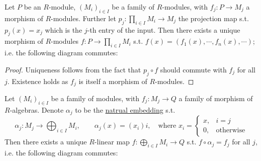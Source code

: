 \begin{theorem}\label{thm:Universal Property of Direct Product}
    Let $P$ be an $R$-module, $(M_i)_{i\in I}$ be a family of $R$-modules, with $f_j: P \to M_j$ a morphism of $R$-modules. Further let $p_j : \prod_{i\in I} M_i \to M_j$ the projection map s.t. $p_j(x) = x_j$ which is the $j$-th entry of the input. Then there exists a unique morphism of $R$-modules $f: P\to\prod_{i\in I} M_i$ s.t. $f(x) = (f_1(x), \cdots, f_n(x), \cdots)$; i.e. the following diagram commutes:
    
    \begin{minipage}{\linewidth}
        \centering
    \end{minipage}
\end{theorem}

\begin{proof}
    Uniqueness follows from the fact that $p_j\circ f$ should commute with $f_j$ for all $j$. Existence holds as $f_j$ is itself a morphism of $R$-modules.
\end{proof}

\begin{theorem}\label{thm:Universal Property of Direct Sum}
    Let $(M_i)_{i\in I}$ be a family of modules, with $f_j: M_j \to Q$ a family of morphism of $R$-algebras. Denote $\alpha_j$ to be the \underline{natrual embedding} s.t.
    \[
        \alpha_j: M_j  \to \bigoplus_{i\in I} M_i, \qquad \alpha_j(x) = (x_i)i, \quad\text{where } x_i = \begin{cases} x, & i = j \\ 0, & \text{otherwise} \end{cases}
    \]
    Then there exists a unique $R$-linear map $f: \bigoplus_{i\in I} M_i \to Q$ s.t. $f\circ \alpha_j = f_j$ for all $j$, i.e. the following diagram commutes:
    
    \begin{minipage}{\linewidth}
        \centering
    \end{minipage}
\end{theorem}

